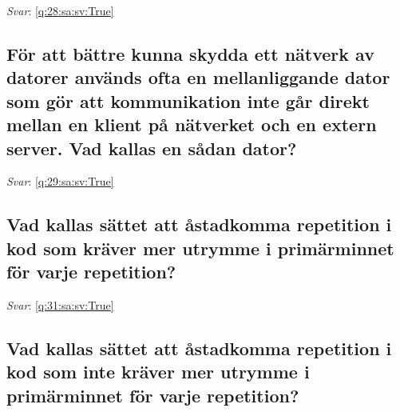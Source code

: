 \documentclass[a4paper,11pt,oneside]{article}
\begin{document}
\begin{sloppypar}
\label{q:28:sa:sv:False}

\vspace{2cm}

\noindent\makebox[\textwidth]{\hrulefill}

\vspace{1cm}

\textit{Svar}: \autoref{q:28:sa:sv:True}



\subsection{F\"or att b\"attre kunna skydda ett n\"atverk av datorer anv\"ands ofta en mellanliggande dator som g\"or att kommunikation inte g\r{a}r direkt mellan en klient p\r{a} n\"atverket och en extern server. Vad kallas en s\r{a}dan dator?}

\label{q:29:sa:sv:False}

\vspace{2cm}

\noindent\makebox[\textwidth]{\hrulefill}

\vspace{1cm}

\textit{Svar}: \autoref{q:29:sa:sv:True}



\subsection{Vad kallas s\"attet att \r{a}stadkomma repetition i kod som kr\"aver mer utrymme i prim\"arminnet f\"or varje repetition?}

\label{q:31:sa:sv:False}

\vspace{2cm}

\noindent\makebox[\textwidth]{\hrulefill}

\vspace{1cm}

\textit{Svar}: \autoref{q:31:sa:sv:True}



\subsection{Vad kallas s\"attet att \r{a}stadkomma repetition i kod som inte kr\"aver mer utrymme i prim\"arminnet f\"or varje repetition?}

\label{q:32:sa:sv:False}

\vspace{2cm}


\end{sloppypar}
\end{document}
